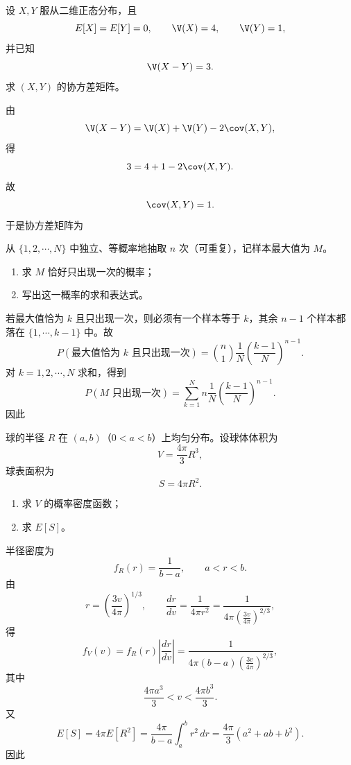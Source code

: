 ﻿

\begin{question}
设 $X,Y$ 服从二维正态分布，且
\[
E[X]=E[Y]=0,
\qquad \V(X)=4,
\qquad \V(Y)=1,
\]
并已知
\[
\V(X-Y)=3.
\]
求 $(X,Y)$ 的协方差矩阵。
\begin{solution}
由
\[
\V(X-Y)=\V(X)+\V(Y)-2\cov(X,Y),
\]
得
\[
3=4+1-2\cov(X,Y).
\]
故
\[
\cov(X,Y)=1.
\]
于是协方差矩阵为
\end{solution}
\end{question}

\begin{question}
从 $\{1,2,\cdots,N\}$ 中独立、等概率地抽取 $n$ 次（可重复），记样本最大值为 $M$。
\begin{enumerate}
\item 求 $M$ 恰好只出现一次的概率；
\item 写出这一概率的求和表达式。
\end{enumerate}
\begin{solution}
若最大值恰为 $k$ 且只出现一次，则必须有一个样本等于 $k$，其余 $n-1$ 个样本都落在 $\{1,\cdots,k-1\}$ 中。故
\[
P(\text{最大值恰为 }k\text{ 且只出现一次})
=\binom{n}{1}\frac1N\left(\frac{k-1}{N}\right)^{n-1}.
\]
对 $k=1,2,\cdots,N$ 求和，得到
\[
P(M\text{ 只出现一次})
=\sum_{k=1}^{N}n\frac1N\left(\frac{k-1}{N}\right)^{n-1}.
\]
因此
\end{solution}
\end{question}

\begin{question}
球的半径 $R$ 在 $(a,b)$（$0<a<b$）上均匀分布。设球体体积为
\[
V=\frac{4\pi}{3}R^3,
\]
球表面积为
\[
S=4\pi R^2.
\]
\begin{enumerate}
\item 求 $V$ 的概率密度函数；
\item 求 $E[S]$。
\end{enumerate}
\begin{solution}
半径密度为
\[
f_R(r)=\frac1{b-a},\qquad a<r<b.
\]
由
\[
r=\left(\frac{3v}{4\pi}\right)^{1/3},
\qquad
\frac{dr}{dv}=\frac{1}{4\pi r^2}
=\frac{1}{4\pi\left(\frac{3v}{4\pi}\right)^{2/3}},
\]
得
\[
f_V(v)=f_R(r)\left|\frac{dr}{dv}\right|
=\frac{1}{4\pi(b-a)\left(\frac{3v}{4\pi}\right)^{2/3}},
\]
其中
\[
\frac{4\pi a^3}{3}<v<\frac{4\pi b^3}{3}.
\]
又
\[
E[S]=4\pi E[R^2]
=\frac{4\pi}{b-a}\int_a^b r^2\,dr
=\frac{4\pi}{3}(a^2+ab+b^2).
\]
因此
\end{solution}
\end{question}

